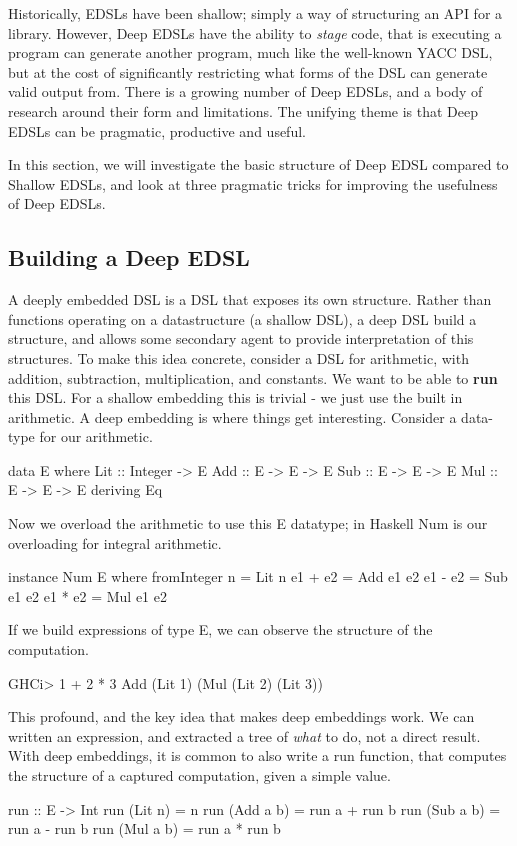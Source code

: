 \documentclass[11pt]{article}
\begin{document}
Historically, EDSLs have been shallow; simply a way of structuring an API for a library. 
However, Deep EDSLs have the ability to {\em stage\/} code, that is executing a program
can generate another program, much like the well-known YACC DSL,
but at the cost of significantly restricting what forms of the DSL can
generate valid output from.
There is a growing number of Deep EDSLs, and a body of research around their
form and limitations.
The unifying theme is that Deep EDSLs can be pragmatic, productive and useful.

In this section, we will investigate the basic structure of Deep EDSL compared to Shallow EDSLs,
and look at three pragmatic tricks for improving the usefulness of Deep EDSLs.

\subsection{Building a Deep EDSL}

A deeply embedded DSL is a DSL that exposes its own structure.
Rather than functions operating on a datastructure (a shallow DSL),
a deep DSL build a structure, and allows some secondary agent to
provide interpretation of this structures.
To make this idea concrete, consider a DSL for arithmetic,
with addition, subtraction, multiplication, and constants.
We want to be able to {\bf run\/} this DSL. For a shallow
embedding this is trivial - we just use the built in 
arithmetic. A deep embedding is where things get
interesting. Consider a data-type for our arithmetic.

\begin{Code}
data E where
 Lit :: Integer -> E
 Add :: E -> E -> E
 Sub :: E -> E -> E
 Mul :: E -> E -> E
 deriving Eq
\end{Code}

Now we overload the arithmetic to use this E datatype;
in Haskell Num is our overloading for integral arithmetic.

\begin{Code}
instance Num E where
  fromInteger n = Lit n
  e1 + e2 = Add e1 e2
  e1 - e2 = Sub e1 e2
  e1 * e2 = Mul e1 e2
\end{Code}

If we build expressions of type E, we can
observe the structure of the computation.
\begin{Code}
GHCi> 1 + 2 * 3
Add (Lit 1) (Mul (Lit 2) (Lit 3))
\end{Code}

This profound, and the key idea that makes deep embeddings work. We can written
an expression, and extracted a tree of {\em what\/} to do, not a direct result.
With deep embeddings, it is common to also
write a run function, that computes the structure
of a captured computation, given a simple value.
\begin{Code}
run :: E -> Int
run (Lit n)   = n
run (Add a b) = run a + run b
run (Sub a b) = run a - run b
run (Mul a b) = run a * run b
\end{Code}
\end{document}
